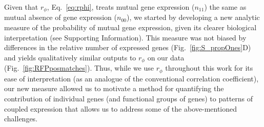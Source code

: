 \documentclass[10pt,letterpaper]{article}
\begin{document}
Given that $r_\phi$, Eq.~\ref{eq:rphi}, treats mutual gene expression ($n_{11}$) the same as mutual absence of gene expression ($n_{00}$), we started by developing a new analytic measure of the probability of mutual gene expression, given its clearer biological interpretation (see Supporting Information).
This measure was not biased by differences in the relative number of expressed genes (Fig.~\ref{fig:S_propOnes}D) and yields qualitatively similar outputs to $r_\phi$ on our data (Fig.~\ref{fig:RFPposmatches}).
Thus, while we use $r_\phi$ throughout this work for its ease of interpretation (as an analogue of the conventional correlation coefficient), our new measure allowed us to motivate a method for quantifying the contribution of individual genes (and functional groups of genes) to patterns of coupled expression that allows us to address some of the above-mentioned challenges.
\end{document}
